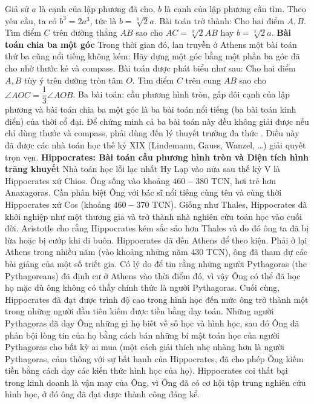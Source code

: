 \begin{multicols}{2}
	\vskip 0.1cm
	Giả sử  $a$ là cạnh của lập phương đã cho,  $b$ là cạnh của lập phương cần tìm. Theo yêu cầu, ta có $b^3 = 2a^3$, tức là $b = \sqrt[3]{2}a$.  Bài toán trở thành: Cho hai điểm $A,B$. Tìm điểm  $C$ trên đường thẳng $AB$  sao cho $AC = \sqrt[3]{2}AB$  hay $b = \sqrt[3]{2}a$.
	\vskip 0.1cm 
	\textbf{\color{lichsutoanhoc}Bài toán chia ba một góc}
	\vskip 0.1cm
	Trong thời gian đó, lan truyền ở Athens một bài toán thứ ba cũng nổi tiếng không kém: Hãy dựng một góc bằng một phần ba góc đã cho nhờ thước kẻ và compass. Bài toán được phát biểu như sau: Cho hai điểm $A,B$ tùy ý trên đường tròn tâm $O$.  Tìm điểm $C$ trên cung $AB$ sao cho $\angle AOC = \dfrac{1}{3} \angle AOB$.
	\vskip 0.1cm  
	Ba bài toán: cầu phương hình tròn, gấp đôi cạnh của lập phương và bài toán chia ba một góc là ba bài toán nổi tiếng (ba bài toán kinh điển) của thời cổ đại. Để chứng minh cả ba bài toán này đều không giải được nếu chỉ dùng thước và compass, phải dùng đến lý thuyết trường đa thức . Điều này đã được các nhà toán học thế kỷ XIX (Lindemann,  Gauss, Wanzel, \ldots) giải quyết trọn vẹn.  
	\vskip 0.1cm
	\textbf{\color{lichsutoanhoc}Hippocrates: Bài toán cầu phương hình tròn  và Diện tích hình trăng khuyết}
	\vskip 0.1cm
	Nhà toán học lỗi lạc nhất Hy Lạp vào nửa sau thế kỷ V là Hippocrates xứ Chios. Ông sống vào khoảng $460-380$ TCN,  hơi trẻ hơn Anaxagoras. Cần phân biệt Ông  với bác sĩ nổi tiếng cùng tên và cùng thời Hippocrates xứ Cos (khoảng $460-370$ TCN). Giống như Thales, Hippocrates đã khởi nghiệp như một thương gia và trở thành nhà nghiên cứu toán học vào cuối đời. Aristotle cho rằng Hippocrates kém sắc sảo hơn Thales và do đó ông ta đã bị lừa hoặc bị cướp khi đi buôn. Hippocrates đã đến Athens để theo kiện. Phải ở lại Athens trong nhiều năm (vào khoảng những năm $430$ TCN), ông đã tham dự các bài giảng của một số triết gia. Có lý do để tin rằng những người Pythagoras (the Pythagoreans) đã định cư ở Athens vào thời điểm đó, vì vậy Ông có thể đã học họ mặc dù ông không có thầy chính thức là người Pythagoras. Cuối cùng, Hippocrates đã đạt được trình độ cao trong hình học đến mức ông trở thành một trong những người đầu tiên kiếm được tiền bằng dạy toán. Những người Pythagoras đã dạy Ông những gì họ biết về số học và hình học, sau đó Ông đã phản bội lòng tin của họ bằng cách bán những bí mật toán học của người Pythagoras cho bất kỳ ai mua (một cách giải thích nhẹ nhàng hơn là người Pythagoras, cảm thông với sự bất hạnh của Hippocrates, đã cho phép Ông kiếm tiền bằng cách dạy các kiến thức hình học của họ).
	\vskip 0.1cm
	Hippocrates coi thất bại trong kinh doanh là vận may của Ông, vì Ông đã có cơ hội tập trung nghiên cứu hình học, ở đó ông đã đạt được thành công đáng kể. 

\end{multicols}
